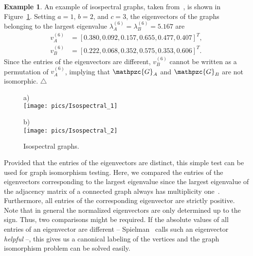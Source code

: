 \documentclass
[
    a4paper,
    DIV=11,
    abstracton
]
{scrartcl}
\newcommand{\subfiguretitle}[1]{{\scriptsize{#1}} \\[1ex]}
\newcommand{\mc}[1]{\mathpzc{#1}}
\newcommand\xqed[1]{\leavevmode\unskip\penalty9999 \hbox{}\nobreak\hfill \quad\hbox{#1}}
\newcommand{\exampleSymbol}{\xqed{$\triangle$}}
\theoremstyle{definition}
\newtheorem{example}[theorem]{Example}
\begin{document}
\begin{example}
An example of isospectral graphs, taken from~\cite{OB12}, is shown in Figure~\ref{fig:Isospectral}. Setting $ a = 1 $, $ b = 2 $, and $ c = 3 $, the eigenvectors of the graphs belonging to the largest eigenvalue $ \lambda_A^{(6)} = \lambda_B^{(6)} = 5.167 $ are
\begin{equation*}
    \begin{split}
        v_A^{(6)} &= [0.380, 0.092, 0.157, 0.655, 0.477, 0.407]^T, \\
        v_B^{(6)} &= [0.222, 0.068, 0.352, 0.575, 0.353, 0.606]^T.
    \end{split}
\end{equation*}
Since the entries of the eigenvectors are different, $ v_B^{(6)} $ cannot be written as a permutation of $ v_A^{(6)} $, implying that $ \mc{G}_A $ and $ \mc{G}_B $ are not isomorphic. \exampleSymbol

\begin{figure}[htb]
    \centering
    \begin{minipage}[t]{0.4\textwidth}
        \centering
        \subfiguretitle{a)}
        \texttt{[image: pics/Isospectral\_1]}
    \end{minipage}
    \begin{minipage}[t]{0.4\textwidth}
        \centering
        \subfiguretitle{b)}
        \texttt{[image: pics/Isospectral\_2]}
    \end{minipage}
    \caption{Isospectral graphs.}
    \label{fig:Isospectral}
\end{figure}

\end{example}

Provided that the entries of the eigenvectors are distinct, this simple test can be used for graph isomorphism testing. Here, we compared the entries of the eigenvectors corresponding to the largest eigenvalue since the largest eigenvalue of the adjacency matrix of a connected graph always has multiplicity one~\cite{Lov07}. Furthermore, all entries of the corresponding eigenvector are strictly positive. Note that in general the normalized eigenvectors are only determined up to the sign. Thus, two comparisons might be required. If the absolute values of all entries of an eigenvector are different -- Spielman~\cite{Spi09} calls such an eigenvector \emph{helpful} --, this gives us a canonical labeling of the vertices and the graph isomorphism problem can be solved easily.
\end{document}
